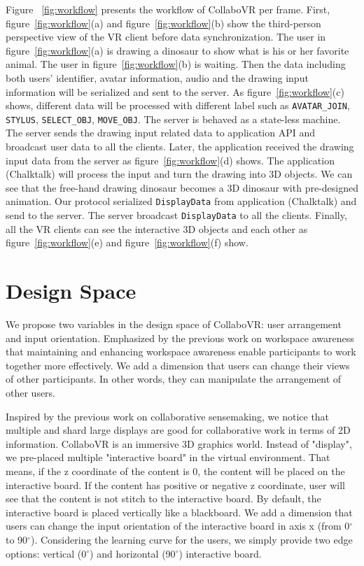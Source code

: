 \documentclass{sigchi}
\begin{document}

Figure ~\ref{fig:workflow} presents the workflow of CollaboVR per frame. First, figure~\ref{fig:workflow}(a) and figure~\ref{fig:workflow}(b) show the third-person perspective view of the VR client before data synchronization. The user in figure~\ref{fig:workflow}(a) is drawing a dinosaur to show what is his or her favorite animal. The user in figure~\ref{fig:workflow}(b) is waiting. Then the data including both users' identifier, avatar information, audio and the drawing input information will be serialized and sent to the server. As figure~\ref{fig:workflow}(c) shows, different data will be processed with different label such as \verb|AVATAR_JOIN|, \verb|STYLUS|, \verb|SELECT_OBJ|, \verb|MOVE_OBJ|. The server is behaved as a state-less machine. The server sends the drawing input related data to application API and broadcast user data to all the clients. Later, the application received the drawing input data from the server as figure~\ref{fig:workflow}(d) shows. The application (Chalktalk) will process the input and turn the drawing into 3D objects. We can see that the free-hand drawing dinosaur becomes a 3D dinosaur with pre-designed animation. Our protocol serialized \verb|DisplayData| from application (Chalktalk) and send to the server. The server broadcast \verb|DisplayData| to all the clients. Finally, all the VR clients can see the interactive 3D objects and each other as figure~\ref{fig:workflow}(e) and figure~\ref{fig:workflow}(f) show.

\section{Design Space}
We propose two variables in the design space of CollaboVR: user arrangement and input orientation. Emphasized by the previous work on workspace awareness that maintaining and enhancing workspace awareness enable participants to work together more effectively. We add a dimension that users can change their views of other participants. In other words, they can manipulate the arrangement of other users. 

Inspired by the previous work on collaborative sensemaking, we notice that multiple and shard large displays are good for collaborative work in terms of 2D information. CollaboVR is an immersive 3D graphics world. Instead of "display", we pre-placed multiple "interactive board" in the virtual environment. That means, if the z coordinate of the content is 0, the content will be placed on the interactive board. If the content has positive or negative z coordinate, user will see that the content is not stitch to the interactive board. By default, the interactive board is placed vertically like a blackboard. We add a dimension that users can change the input orientation of the interactive board in axis x (from 0$^{\circ}$ to 90$^{\circ}$). Considering the learning curve for the users, we simply provide two edge options: vertical (0$^{\circ}$) and horizontal (90$^{\circ}$) interactive board.
\end{document}

